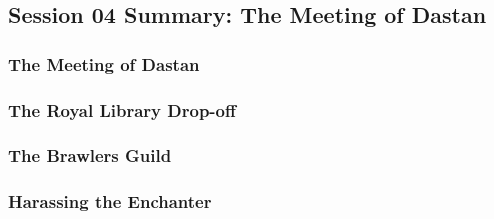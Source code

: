 \subsection{Session 04 Summary: The Meeting of Dastan}

\subsubsection{The Meeting of Dastan}

\subsubsection{The Royal Library Drop-off}

\subsubsection{The Brawlers Guild}

\subsubsection{Harassing the Enchanter}